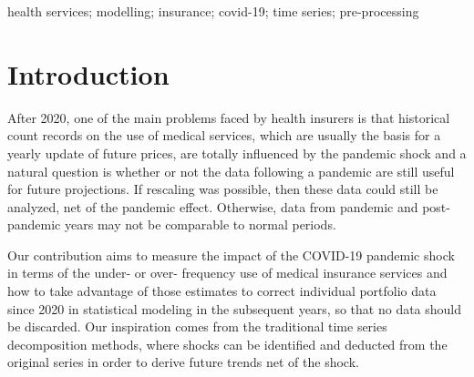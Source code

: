 \documentclass[]{risa}
\begin{document}
\begin{abstract}
\end{abstract}

\begin{keywords}
health services; modelling; insurance; covid-19; time series; pre-processing
\end{keywords}

\maketitle

\section{Introduction}\label{intro}
After 2020, one of the main problems faced by health insurers is that historical count records on the use of medical services, which are usually the basis for a yearly update of future prices, are totally influenced by the pandemic shock \cite{kim2022impact, xu2021impact, cantor2022impact} and a natural question is whether or not the data following a pandemic are still useful for future projections. If rescaling was possible, then these data could still be analyzed, net of the pandemic effect. Otherwise, data from pandemic and post-pandemic years may not be comparable to normal periods.


Our contribution aims to measure the impact of the COVID-19 pandemic shock in terms of the under- or over- frequency use of medical insurance services and how to take advantage of those estimates to correct individual portfolio data since 2020 in statistical modeling in the subsequent years, so that no data should be discarded. Our inspiration comes from the traditional time series decomposition methods, where shocks can be identified and deducted from the original series in order to derive future trends net of the shock. 
\end{document}
